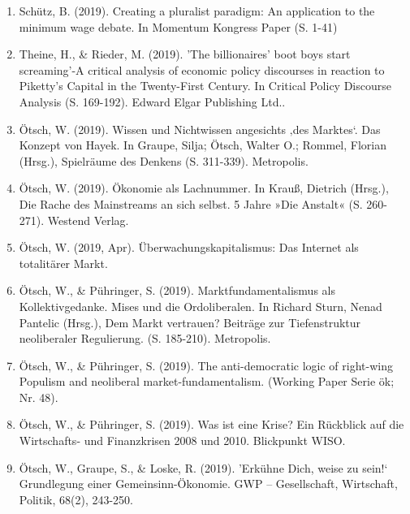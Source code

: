 \begin{enumerate}
	 \item Schütz, B. (2019). Creating a pluralist paradigm: An application to the minimum wage debate. In Momentum Kongress Paper (S. 1-41)
	 \item Theine, H., \& Rieder, M. (2019). 'The billionaires' boot boys start screaming'-A critical analysis of economic policy discourses in reaction to Piketty's Capital in the Twenty-First Century. In Critical Policy Discourse Analysis (S. 169-192). Edward Elgar Publishing Ltd..
	 \item Ötsch, W. (2019). Wissen und Nichtwissen angesichts ‚des Marktes‘. Das Konzept von Hayek. In Graupe, Silja; Ötsch, Walter O.; Rommel, Florian (Hrsg.), Spielräume des Denkens (S. 311-339). Metropolis.
	 \item Ötsch, W. (2019). Ökonomie als Lachnummer. In Krauß, Dietrich (Hrsg.), Die Rache des Mainstreams an sich selbst. 5 Jahre »Die Anstalt« (S. 260-271). Westend Verlag.
	 \item Ötsch, W. (2019, Apr). Überwachungskapitalismus: Das Internet als totalitärer Markt.
	 \item Ötsch, W., \& Pühringer, S. (2019). Marktfundamentalismus als Kollektivgedanke. Mises und die Ordoliberalen. In Richard Sturn, Nenad Pantelic (Hrsg.), Dem Markt vertrauen? Beiträge zur Tiefenstruktur neoliberaler Regulierung. (S. 185-210). Metropolis.
	 \item Ötsch, W., \& Pühringer, S. (2019). The anti-democratic logic of right-wing Populism and neoliberal market-fundamentalism. (Working Paper Serie ök; Nr. 48).
	 \item Ötsch, W., \& Pühringer, S. (2019). Was ist eine Krise? Ein Rückblick auf die Wirtschafts- und Finanzkrisen 2008 und 2010. Blickpunkt WISO.
	 \item Ötsch, W., Graupe, S., \& Loske, R. (2019). ’Erkühne Dich, weise zu sein!‘ Grundlegung einer Gemeinsinn-Ökonomie. GWP -- Gesellschaft, Wirtschaft, Politik, 68(2), 243-250.
\end{enumerate}
